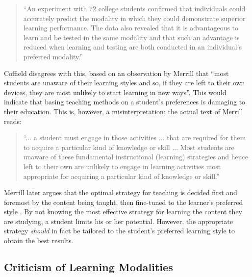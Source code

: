 \documentclass[bsc,twoside,singlespacing,parskip,logo,notimes,normalheadings]{infthesis}
\begin{document}
        \begin{quote}
          ``An experiment with 72 college students confirmed that
          individuals could accurately predict the modality in which
          they could demonstrate superior learning performance. The
          data also revealed that it is advantageous to learn and be
          tested in the same modality and that such an advantage is
          reduced when learning and testing are both conducted in an
          individual's preferred modality.''\cite[p. 242]{dunn1979}
        \end{quote}

        Coffield\cite[p. 120]{coffield2004} disagrees with this, based
        on an observation by Merrill\cite{merrill2000} that ``most
        students are unaware of their learning styles and so, if they
        are left to their own devices, they are most unlikely to start
        learning in new ways''. This would indicate that basing
        teaching methods on a student's preferences is damaging to
        their education. This is, however, a misinterpretation; the
        actual text of Merrill reads:

        \begin{quote}
          ``... a student must engage in those activities ... that are
          required for them to acquire a particular kind of knowledge
          or skill ... Most students are unaware of these fundamental
          instructional (learning) strategies and hence left to their
          own are unlikely to engage in learning activities most
          appropriate for acquiring a particular kind of knowledge or
          skill.''\cite[p. 4]{merrill2000}
        \end{quote}

        Merrill later argues that the optimal strategy for teaching is
        decided first and foremost by the content being taught, then
        fine-tuned to the learner's preferred style
        \cite[p. 4]{merrill2000}. By not knowing the most effective
        strategy for learning the content they are studying, a student
        limits his or her potential. However, the appropriate strategy
        {\em should} in fact be tailored to the student's preferred
        learning style to obtain the best results.

        \subsection{Criticism of Learning Modalities}\label{sec:matching}
\end{document}
